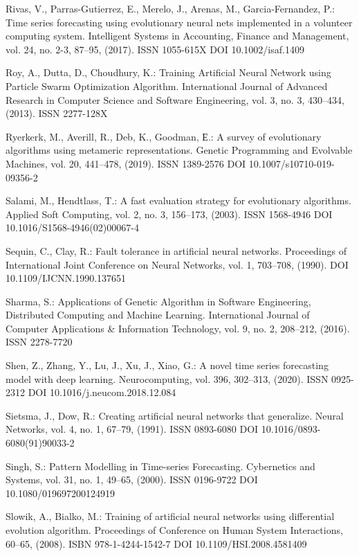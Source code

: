 \begin{thebibliography}{99.}
 Rivas, V., Parras-Gutierrez, E., Merelo, J., Arenas, M., Garcia-Fernandez, P.: Time series forecasting using evolutionary neural nets implemented in a volunteer computing system. Intelligent Systems in Accounting, Finance and Management, vol. 24, no. 2-3, 87--95, (2017). ISSN 1055-615X DOI 10.1002/isaf.1409

 Roy, A., Dutta, D., Choudhury, K.: Training Artificial Neural Network using Particle Swarm Optimization Algorithm. International Journal of Advanced Research in Computer Science and Software Engineering, vol. 3, no. 3, 430--434, (2013). ISSN 2277-128X

 Ryerkerk, M., Averill, R., Deb, K., Goodman, Е.: A survey of evolutionary algorithms using metameric representations. Genetic Programming and Evolvable Machines, vol. 20, 441--478, (2019). ISSN 1389-2576 DOI 10.1007/s10710-019-09356-2

 Salami, M., Hendtlass, T.: A fast evaluation strategy for evolutionary algorithms. Applied Soft Computing, vol. 2, no. 3, 156--173, (2003). ISSN 1568-4946 DOI 10.1016/S1568-4946(02)00067-4

 Sequin, C., Clay, R.: Fault tolerance in artificial neural networks. Proceedings of International Joint Conference on Neural Networks, vol. 1, 703--708, (1990). DOI 10.1109/IJCNN.1990.137651

 Sharma, S.: Applications of Genetic Algorithm in Software Engineering, Distributed Computing and Machine Learning. International Journal of Computer Applications \& Information Technology, vol. 9, no. 2, 208--212, (2016). ISSN 2278-7720

 Shen, Z., Zhang, Y., Lu, J., Xu, J., Xiao, G.: A novel time series forecasting model with deep learning. Neurocomputing, vol. 396, 302--313, (2020). ISSN 0925-2312 DOI 10.1016/j.neucom.2018.12.084

 Sietsma, J., Dow, R.: Creating artificial neural networks that generalize. Neural Networks, vol. 4, no. 1, 67--79, (1991). ISSN 0893-6080 DOI 10.1016/0893-6080(91)90033-2

 Singh, S.: Pattern Modelling in Time-series Forecasting. Cybernetics and Systems, vol. 31, no. 1, 49--65, (2000). ISSN 0196-9722 DOI 10.1080/019697200124919

 Slowik, A., Bialko, M.: Training of artificial neural networks using differential evolution algorithm. Proceedings of Conference on Human System Interactions, 60--65, (2008). ISBN 978-1-4244-1542-7 DOI 10.1109/HSI.2008.4581409


\end{thebibliography}
